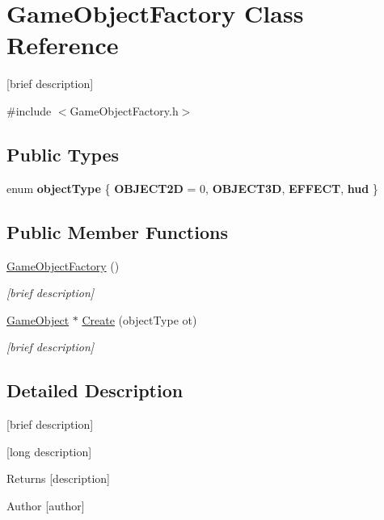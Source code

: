 \hypertarget{class_game_object_factory}{\section{Game\-Object\-Factory Class Reference}
\label{class_game_object_factory}
}


\mbox{[}brief description\mbox{]}  




{\ttfamily \#include $<$Game\-Object\-Factory.\-h$>$}

\subsection*{Public Types}
\begin{DoxyCompactItemize}
\item 
enum {\bfseries object\-Type} \{ {\bfseries O\-B\-J\-E\-C\-T2\-D} = 0, 
{\bfseries O\-B\-J\-E\-C\-T3\-D}, 
{\bfseries E\-F\-F\-E\-C\-T}, 
{\bfseries hud}
 \}
\end{DoxyCompactItemize}
\subsection*{Public Member Functions}
\begin{DoxyCompactItemize}
\item 
\hyperlink{class_game_object_factory_acb06c511e88956d6e47c28d026dc8ddd}{Game\-Object\-Factory} ()
\begin{DoxyCompactList}\small\item\em \mbox{[}brief description\mbox{]} \end{DoxyCompactList}\item 
\hyperlink{class_game_object}{Game\-Object} $\ast$ \hyperlink{class_game_object_factory_a5929bc6ad461c9668b478cf68bfd7311}{Create} (object\-Type ot)
\begin{DoxyCompactList}\small\item\em \mbox{[}brief description\mbox{]} \end{DoxyCompactList}\end{DoxyCompactItemize}


\subsection{Detailed Description}
\mbox{[}brief description\mbox{]} 

\mbox{[}long description\mbox{]} \begin{DoxyReturn}{Returns}
\mbox{[}description\mbox{]} 
\end{DoxyReturn}
\begin{DoxyAuthor}{Author}
\mbox{[}author\mbox{]} 
\end{DoxyAuthor}


